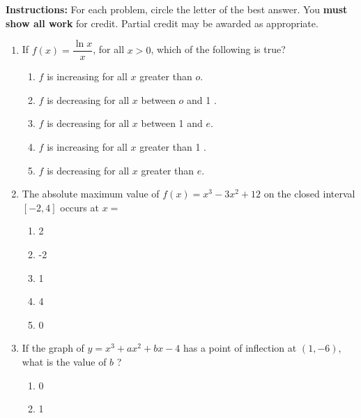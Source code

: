 \documentclass{article}
\begin{document}
\pagestyle{fancy}
\fancyhf{}
\renewcommand{\footrulewidth}{0.4pt}

\noindent
\textbf{Instructions:} For each problem, circle the letter of the best answer.
You \textbf{must show all work} for credit. Partial credit may be awarded as appropriate.

\begin{enumerate}
	\itemsep2em
	\item
	\begin{minipage}[t]{\linewidth}
		If \({f}({x})=\dfrac{\ln x}{{x}}\), for all \({x}>0\), which of the
following is true?
\vspace{1em}
		\begin{enumerate}
		\itemsep1em
			\item \({f}\) is increasing for all \({x}\) greater than \({o}\).
			\item \(f\) is decreasing for all \(x\) between \(o\) and 1 .
			\item \(f\) is decreasing for all \(x\) between 1 and \(e\).
			\item \({f}\) is increasing for all \({x}\) greater than 1 .
			\item \(f\) is decreasing for all \(x\) greater than \(e\).
		\end{enumerate}
	\end{minipage}
	\item
	\begin{minipage}[t]{\linewidth}
		The absolute maximum value of \(f(x)=x^{3}-3 x^{2}+12\) on the closed
interval \([-2,4]\) occurs at \(x=\)
\vspace{1em}
		\begin{enumerate}
		\itemsep1em
			\item 2
			\item -2
			\item 1
			\item 4
			\item 0
		\end{enumerate}
	\end{minipage}
	\item
	\begin{minipage}[t]{\linewidth}
		If the graph of \(y=x^{3}+a x^{2}+b x-4\) has a point of inflection at
\((1,-6)\), what is the value of \(b\) ?
\vspace{1em}
		\begin{enumerate}
		\itemsep1em
			\item 0
			\item 1

\end{enumerate}
\end{minipage}
\end{enumerate}
\end{document}
